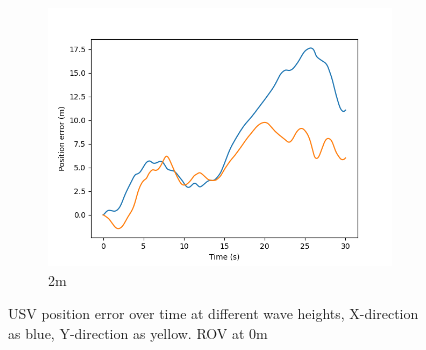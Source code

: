 \documentclass[class=article, crop=false]{standalone}
\begin{document}
\begin{figure}
\begin{subfigure}[b]{0.48\textwidth}
        \centering
        \includegraphics{scenario1/rov-0m/2.0m/usv_pos_error_controlled}
        \caption{2m}
        \label{}
    \end{subfigure}
    \caption{USV position error over time at different wave heights, X-direction as blue, Y-direction as yellow. ROV at 0m}
    \label{}
\end{figure}
\end{document}
